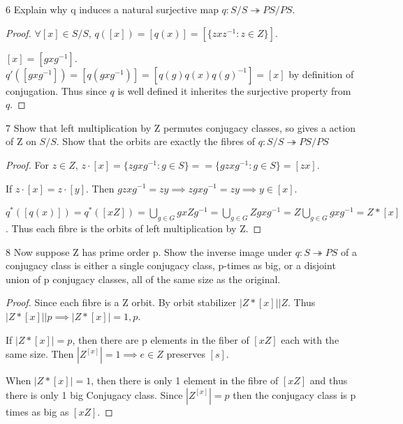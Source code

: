 \documentclass{article}
\begin{document}
\begin{PROB}{6}\label{Problem 6.}
    Explain why q induces a natural surjective map $q: S/S \twoheadrightarrow  PS/PS$. 
\end{PROB}
\begin{proof}
    $\forall [x] \in S/S$, $q([x]) = [q(x)] = [\{zxz^{-1} : z \in Z\}]$.

    $[x] = [gxg^{-1}]$. $q'([gxg^{-1}]) = [q(gxg^{-1})] = [q(g)q(x)q(g)^{-1}] = [x]$ by definition of conjugation. Thus since $q$ is well defined it inherites the surjective property from $q$.
\end{proof}

\bigskip

\begin{PROB}{7}\label{Problem 7.}
    Show that left multiplication by Z permutes conjugacy classes, so gives a action of Z on $S/S$. Show that the orbits are exactly the fibres of $q: S/S \twoheadrightarrow PS/PS$
\end{PROB}
\begin{proof}
    For $z \in Z$, 
    $z \cdot [x] = \{zgxg^{-1} : g \in S\} == \{gzxg^{-1} : g \in S\} = [zx]$.

    If $z \cdot [x] = z \cdot [y]$. Then $gzxg^{-1} = zy \implies zgxg^{-1} = zy \implies y \in [x]$.


    $q^*([q(x)]) = q^*([xZ]) = \bigcup_{g \in G}gxZg^{-1} = \bigcup_{g \in G}Z gxg^{-1} =Z \bigcup_{g \in G}gxg^{-1} = Z * [x]$. Thus each fibre is the orbits of left multiplication by Z.
\end{proof}

\bigskip

\begin{PROB}{8}\label{Problem 8.}
    Now suppose Z has prime order p. Show the inverse image under $q:S \twoheadrightarrow PS$ of a conjugacy class is either a single conjugacy class, p-times as big, or a disjoint union of p conjugacy classes, all of the same size as the original.  
\end{PROB}
\begin{proof}
    Since each fibre is a Z orbit. By orbit stabilizer $|Z * [x]| | Z$. Thus $|Z * [x]| | p \implies |Z * [x]| = 1, p$. 
    
    If $|Z * [x]| = p$, then there are p elements in the fiber of $[xZ]$ each with the same size. Then $|Z^{[x]}| = 1 \implies e \in Z$ preserves $[s]$.

    When $|Z * [x]| = 1$, then there is only 1 element in the fibre of $[xZ]$ and thus there is only 1 big Conjugacy class. Since $|Z^{[x]}| = p$ then the conjugacy class is p times as big as $[xZ]$.
\end{proof}
\end{document}
